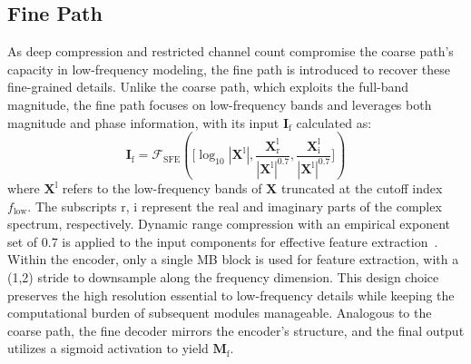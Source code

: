 \documentclass[journal]{IEEEtran}
\begin{document}
\subsection{Fine Path}
As deep compression and restricted channel count compromise the coarse path's capacity in low-frequency modeling, the fine path is introduced to recover these fine-grained details.
Unlike the coarse path, which exploits the full-band magnitude, the fine path focuses on low-frequency bands and leverages both magnitude and phase information, with its input $\mathbf{I}_{\text{f}}$ calculated as:
\begin{equation}
\mathbf{I}_{\text{f}} = \mathcal{F}_{\text{SFE}} \left( 
\bigg[ 
  \log_{10}|\mathbf{X}^\text{l}|, 
  \frac{\mathbf{X}_{\text{r}}^\text{l}}{|\mathbf{X}^\text{l}|^{0.7}}, 
  \frac{\mathbf{X}_{\text{i}}^\text{l}}{|\mathbf{X}^\text{l}|^{0.7}} 
\bigg]
\right)
\label{eq:fine_input}
\end{equation}
\noindent where $\mathbf{X}^{\text{l}}$ refers to the low-frequency bands of $\mathbf{X}$ truncated at the cutoff index $f_{\text{low}}$.
The subscripts $\text{r}$, $\text{i}$ represent the real and imaginary parts of the complex spectrum, respectively.
Dynamic range compression with an empirical exponent set of 0.7 is applied to the input components for effective feature extraction~\cite{compress, adaptivecrn, lisennet}.
Within the encoder, only a single MB block is used for feature extraction, with a (1,2) stride to downsample along the frequency dimension.
This design choice preserves the high resolution essential to low-frequency details while keeping the computational burden of subsequent modules manageable.
Analogous to the coarse path, the fine decoder mirrors the encoder's structure, and the final output utilizes a sigmoid activation to yield $\mathbf{M}_{\text{f}}$.
\end{document}
